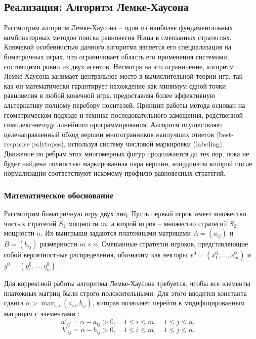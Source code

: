 \subsection{Реализация: Алгоритм Лемке-Хаусона}

Рассмотрим алгоритм Лемке-Хаусона – один из наиболее фундаментальных комбинаторных методов поиска равновесия Нэша в смешанных стратегиях. Ключевой особенностью данного алгоритма является его специализация на биматричных играх, что ограничивает область его применения системами, состоящими ровно из двух агентов. Несмотря на это ограничение, алгоритм Лемке-Хаусона занимает центральное место в вычислительной теории игр, так как он математически гарантирует нахождение как минимум одной точки равновесия в любой конечной игре, предоставляя более эффективную альтернативу полному перебору носителей. Принцип работы метода основан на геометрическом подходе и технике последовательного замещения, родственной симплекс-методу линейного программирования. Алгоритм осуществляет целенаправленный обход вершин многогранников наилучших ответов (best-response polytopes), используя систему числовой маркировки (labeling). Движение по ребрам этих многомерных фигур продолжается до тех пор, пока не будет найдена полностью маркированная пара вершин, координаты которой после нормализации соответствуют искомому профилю равновесных стратегий.

\subsubsection{Математическое обоснование}

Рассмотрим биматричную игру двух лиц. Пусть первый игрок имеет множество чистых стратегий $S_1$ мощности $m$, а второй игрок – множество стратегий $S_2$ мощности $n$. Их выигрыши задаются платежными матрицами $A = (a_{ij})$ и $B = (b_{ij})$ размерности $m \times n$. Смешанные стратегии игроков, представляющие собой вероятностные распределения, обозначим как векторы $x^0 = (x_1^0, \dots, x_m^0)$ и $y^0 = (y_1^0, \dots, y_n^0)$.

Для корректной работы алгоритма Лемке-Хаусона требуется, чтобы все элементы платежных матриц были строго положительными. Для этого вводится константа сдвига $\alpha > \max_{i,j}(a_{ij}, b_{ij})$, которая позволяет перейти к модифицированным матрицам с элементами \cite{nabatova2015}:
\begin{equation}
a'_{ij} = \alpha - a_{ij} > 0, \quad 1 \leqslant i \leqslant m, \quad 1 \leqslant j \leqslant n,
\end{equation}
\begin{equation}
b'_{ij} = \alpha - b_{ij} > 0, \quad 1 \leqslant i \leqslant m, \quad 1 \leqslant j \leqslant n.
\end{equation}

